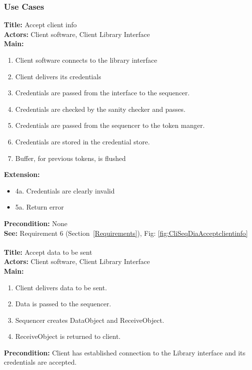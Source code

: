 	\subsubsection{Use Cases}\label{client use cases}
		\textbf{Title:} Accept client info \\
		\textbf{Actors:} Client software, Client Library Interface \\
		\textbf{Main:}
		\begin{enumerate}
			\item Client software connects to the library interface
			\item Client delivers its credentials
			\item Credentials are passed from the interface to the sequencer.
			\item Credentials are checked by the sanity checker and passes.
			\item Credentials are passed from the sequencer to the token manger.
			\item Credentials are stored in the credential store.
			\item Buffer, for previous tokens, is flushed
		\end{enumerate}
		\textbf{Extension:} 
		\begin{itemize}
			  \item[] 4a. Credentials are clearly invalid
			  \item[] 5a. Return error
		\end{itemize}
		\textbf{Precondition:}  None\\
		\textbf{See:} Requirement 6 (Section~\ref{Requirements}), Fig: \ref{fig:CliSeqDiaAcceptclientinfo}
		\\\\
		\textbf{Title:} Accept data to be sent \\
		\textbf{Actors:} Client software, Client Library Interface \\
		\textbf{Main:}
		\begin{enumerate}
			\item Client delivers data to be sent.
			\item Data is passed to the sequencer.
			\item Sequencer creates DataObject and ReceiveObject.
			\item ReceiveObject is returned to client.
		\end{enumerate}
		\textbf{Precondition:} Client has established connection to the Library interface and its credentials are accepted. \\

